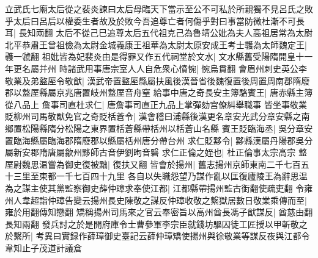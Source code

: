 立武氏七廟太后從之裴炎諫曰太后母臨天下當示至公不可私於所親獨不見呂氏之敗乎太后曰呂后以權委生者故及於敗今吾追尊亡者何傷乎對曰事當防微杜漸不可長耳|{
	長知兩翻}
太后不從己巳追尊太后五代祖克己為魯靖公妣為夫人高祖居常為太尉北平恭肅王曾祖儉為太尉金城義康王祖華為太尉太原安成王考士彠為太師魏定王|{
	彠一虢翻}
祖妣皆為妃裴炎由是得罪又作五代祠堂於文水|{
	文水縣舊受陽隋開皇十一年更名屬并州}
時諸武用事唐宗室人人自危衆心憤惋|{
	惋烏貫翻}
會眉州刺史英公李敬業及弟盩厔令敬猷|{
	漢武帝置盩厔縣屬扶風後漢晉省後魏復置後周置周南郡隋廢郡以盩厔縣屬京兆唐置岐州盩厔音舟窒}
給事中唐之奇長安主簿駱賓王|{
	唐赤縣主簿從八品上}
詹事司直杜求仁|{
	唐詹事司直正九品上掌彈劾宫僚糾舉職事}
皆坐事敬業貶柳州司馬敬猷免官之奇貶栝蒼令|{
	漢會稽曰浦縣後漢更名章安光武分章安縣之南鄉置松陽縣隋分松陽之東界置栝蒼縣帶栝州以栝蒼山名縣}
賓王貶臨海丞|{
	吳分章安置臨海縣屬臨海郡隋廢郡以縣屬栝州唐分帶台州}
求仁貶黟令|{
	黟縣漢屬丹陽郡吳分屬新安郡隋唐屬歙州黟師古音伊劉昫音䃜}
求仁正倫之姪也|{
	杜正倫事太宗高宗}
盩厔尉魏思温嘗為御史復被黜|{
	復扶又翻}
皆會於揚州|{
	舊志揚州京師東南二千七百五十三里至東都一千七百四十九里}
各自以失職怨望乃謀作亂以匡復廬陵王為辭思温為之謀主使其黨監察御史薛仲璋求奉使江都|{
	江都縣帶揚州監古衘翻使疏吏翻}
令雍州人韋超詣仲璋告變云揚州長史陳敬之謀反仲璋收敬之繫獄居數日敬業乘傳而至|{
	雍於用翻傳知戀翻}
矯稱揚州司馬來之官云奉密旨以高州酋長馮子猷謀反|{
	酋慈由翻長知兩翻}
發兵討之於是開府庫令士曹參軍李宗臣就錢坊驅囚徒工匠授以甲斬敬之於繫所|{
	考異曰實録作薛璋御史臺記云薛仲璋矯使揚州與徐敬業等謀反夜與江都令韋知止子茂道計議倉}


